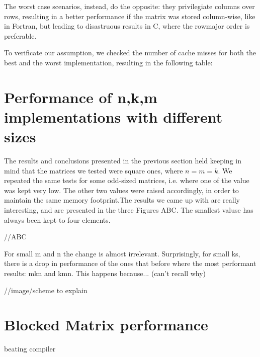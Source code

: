 The worst case scenarios, instead, do the opposite: they privilegiate columns over rows, resulting in a better performance if the matrix was stored column-wise, like in Fortran, but leading to disastruous results in C, where the rowmajor order is preferable.

To verificate our assumption, we checked the number of cache misses for both the best and the worst implementation, resulting in the following table:

\section{Performance of n,k,m implementations with different sizes}
The results and conclusions presented in the previous section held keeping in mind that the matrices we tested were square ones, where $n=m=k$. We repeated the same tests for some odd-sized matrices, i.e. where one of the value was kept very low. The other two values were raised accordingly, in order to maintain the same memory footprint.The results we came up with are really interesting, and are presented in the three Figures ABC. The smallest valuse has always been kept to four elements.

//ABC

For small m and n the change is almost irrelevant. Surprisingly, for small ks, there is a drop in performance of the ones that before where the most performant results: mkn and kmn. This happens because... (can't recall why)

//image/scheme to explain

\section{Blocked Matrix performance}


beating compiler


